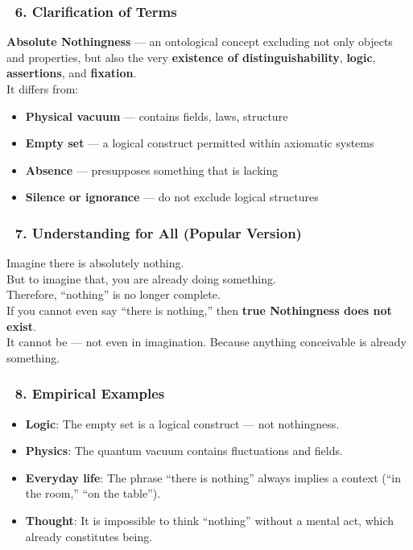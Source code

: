 \documentclass[12pt]{article}
\begin{document}
\subsubsection*{🔹 6. Clarification of Terms}
\textbf{Absolute Nothingness} — an ontological concept excluding not only objects and properties, but also the very \textbf{existence of distinguishability}, \textbf{logic}, \textbf{assertions}, and \textbf{fixation}.\\
It differs from:
\begin{itemize}
\item \textbf{Physical vacuum} — contains fields, laws, structure
\item \textbf{Empty set} — a logical construct permitted within axiomatic systems
\item \textbf{Absence} — presupposes something that is lacking
\item \textbf{Silence or ignorance} — do not exclude logical structures
\end{itemize}

\subsubsection*{🔹 7. Understanding for All (Popular Version)}
Imagine there is absolutely nothing.\\
But to imagine that, you are already doing something.\\
Therefore, ``nothing'' is no longer complete.\\
If you cannot even say ``there is nothing,'' then \textbf{true Nothingness does not exist}.\\
It cannot be — not even in imagination. Because anything conceivable is already something.

\subsubsection*{🔹 8. Empirical Examples}
\begin{itemize}
\item \textbf{Logic}: The empty set is a logical construct — not nothingness.
\item \textbf{Physics}: The quantum vacuum contains fluctuations and fields.
\item \textbf{Everyday life}: The phrase ``there is nothing'' always implies a context (``in the room,'' ``on the table'').
\item \textbf{Thought}: It is impossible to think ``nothing'' without a mental act, which already constitutes being.
\end{itemize}
\end{document}
